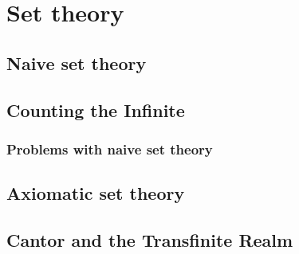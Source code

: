\chapter{Set theory}

\section{Naive set theory}
\section{Counting the Infinite}
\subsection{Problems with naive set theory}
\section{Axiomatic set theory}
\section{Cantor and the Transfinite Realm}
